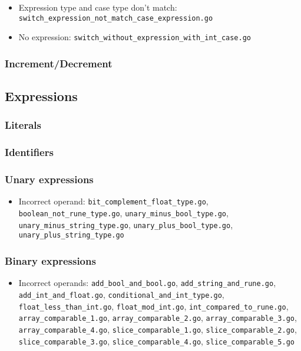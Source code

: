 \documentclass{article}
\begin{document}
\begin{itemize}
\item Expression type and case type don't match: \texttt{switch_expression_not_match_case_expression.go}
\item No expression: \texttt{switch_without_expression_with_int_case.go}
\end{itemize}

\subsubsection*{Increment/Decrement}

\subsection*{Expressions}

\subsubsection*{Literals}
\subsubsection*{Identifiers}
\subsubsection*{Unary expressions}

\begin{itemize}
\item Incorrect operand: \texttt{bit_complement_float_type.go}, \texttt{boolean_not_rune_type.go}, \texttt{unary_minus_bool_type.go}, \texttt{unary_minus_string_type.go}, \texttt{unary_plus_bool_type.go}, \texttt{unary_plus_string_type.go}
\end{itemize}

\subsubsection*{Binary expressions}

\begin{itemize}
\item Incorrect operands: \texttt{add_bool_and_bool.go}, \texttt{add_string_and_rune.go}, \texttt{add_int_and_float.go}, \texttt{conditional_and_int_type.go}, \texttt{float_less_than_int.go}, \texttt{float_mod_int.go}, \texttt{int_compared_to_rune.go}, \texttt{array_comparable_1.go}, \texttt{array_comparable_2.go}, \texttt{array_comparable_3.go}, \texttt{array_comparable_4.go}, \texttt{slice_comparable_1.go}, \texttt{slice_comparable_2.go}, \texttt{slice_comparable_3.go}, \texttt{slice_comparable_4.go}, \texttt{slice_comparable_5.go}
\end{itemize}
\end{document}
